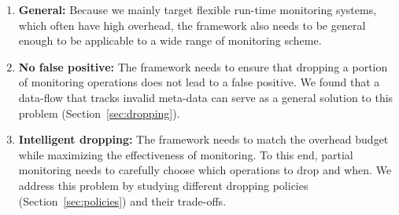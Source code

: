 \begin{enumerate}
  \item \textbf{General:} Because we mainly target flexible run-time monitoring systems,
  which often have high overhead, the framework also needs to be general enough to be
  applicable to a wide range of monitoring scheme.

  \item \textbf{No false positive:} The framework needs to ensure that dropping a portion
  of monitoring operations does not lead to a false positive. We found that a data-flow
  that tracks invalid meta-data can serve as a general solution to this problem 
  (Section~\ref{sec:dropping}).

  \item \textbf{Intelligent dropping:} The framework needs to match the overhead budget
  while maximizing the effectiveness of monitoring. To this end, partial 
  monitoring needs to carefully choose which operations to drop and when. We address this
  problem by studying different dropping policies (Section~\ref{sec:policies}) and their
  trade-offs.

\end{enumerate}

